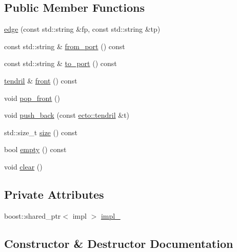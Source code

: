 \subsection*{Public Member Functions}
\begin{DoxyCompactItemize}
\item 
\hyperlink{structecto_1_1graph_1_1edge_a8006b69871f55450b8acec6ac05762d4}{edge} (const std\+::string \&fp, const std\+::string \&tp)
\item 
const std\+::string \& \hyperlink{structecto_1_1graph_1_1edge_a2fb1c33fc4d337b719a1666eab943da5}{from\+\_\+port} () const 
\item 
const std\+::string \& \hyperlink{structecto_1_1graph_1_1edge_ab1c782c9d14a3f58504783747e14f7e0}{to\+\_\+port} () const 
\item 
\hyperlink{classecto_1_1tendril}{tendril} \& \hyperlink{structecto_1_1graph_1_1edge_ac2cd2d873aa55199e44f836ffada307e}{front} () const 
\item 
void \hyperlink{structecto_1_1graph_1_1edge_a0b530770694143bc00bc6c563b64a3c9}{pop\+\_\+front} ()
\item 
void \hyperlink{structecto_1_1graph_1_1edge_a257de20468c8c1b6c606448ba39c493c}{push\+\_\+back} (const \hyperlink{classecto_1_1tendril}{ecto\+::tendril} \&t)
\item 
std\+::size\+\_\+t \hyperlink{structecto_1_1graph_1_1edge_a539c89ca50c781c95ece29f7cade4d1d}{size} () const 
\item 
bool \hyperlink{structecto_1_1graph_1_1edge_ab8857a18a55e6d230e84a2a07242d67e}{empty} () const 
\item 
void \hyperlink{structecto_1_1graph_1_1edge_a2761342510ae1bedb1c91bbbda5f46ef}{clear} ()
\end{DoxyCompactItemize}
\subsection*{Private Attributes}
\begin{DoxyCompactItemize}
\item 
boost\+::shared\+\_\+ptr$<$ impl $>$ \hyperlink{structecto_1_1graph_1_1edge_a88b7d991f162cd009884c3061da8169d}{impl\+\_\+}
\end{DoxyCompactItemize}


\subsection{Constructor \& Destructor Documentation}
